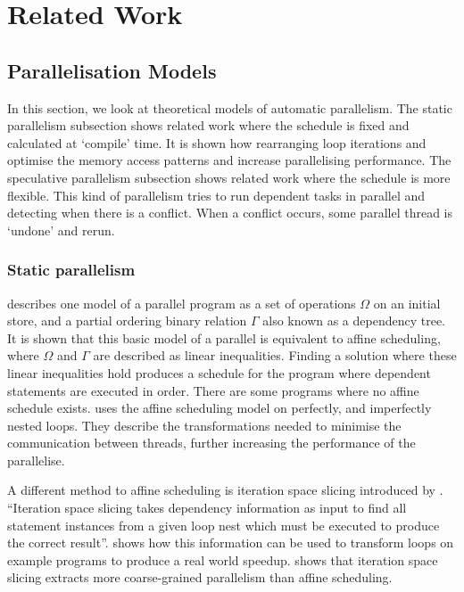 \documentclass[conference]{IEEEtran}
\begin{document}
\section{Related Work}
\label{sec:related-work}

\subsection{Parallelisation Models}
\label{sec:related-models}
In this section, we look at theoretical models of automatic parallelism. The static parallelism subsection shows related work where the schedule is fixed and calculated at `compile' time. It is shown how rearranging loop iterations and optimise the memory access patterns and increase parallelising performance. The speculative parallelism subsection shows related work where the schedule is more flexible. This kind of parallelism tries to run dependent tasks in parallel and detecting when there is a conflict. When a conflict occurs, some parallel thread is `undone' and rerun.

\subsubsection{Static parallelism}
\textcite{Feautrier1992,Feautrier1992a} describes one model of a parallel program as a set of operations $\Omega$ on an initial store, and a partial ordering binary relation $\Gamma$ also known as a dependency tree. It is shown that this basic model of a parallel is equivalent to affine scheduling, where $\Omega$ and $\Gamma$ are described as linear inequalities. Finding a solution where these linear inequalities hold produces a schedule for the program where dependent statements are executed in order. There are some programs where no affine schedule exists.
\textcite{Bondhugula2008} uses the affine scheduling model on perfectly, and imperfectly nested loops. They describe the transformations needed to minimise the communication between threads, further increasing the performance of the parallelise.

A different method to affine scheduling is iteration space slicing introduced by \textcite{Pugh1997}. ``Iteration space slicing takes dependency information as input to find all statement instances from a given loop nest which must be executed to produce the correct result''. \textcite{Pugh1997} shows how this information can be used to transform loops on example programs to produce a real world speedup. \textcite{Beletska2011} shows that iteration space slicing extracts more coarse-grained parallelism than affine scheduling.
\end{document}
